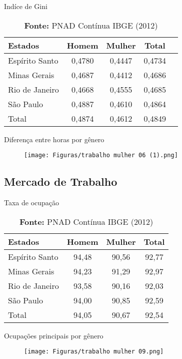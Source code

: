 \documentclass[xcolor={dvipsnames}]{beamer}
\begin{document}
\begin{frame}{Indíce de Gini}
    \begin{table}[h]
    \caption{Índice de Gini por UF e gênero}
    \centering
    \begin{tabular}{lcccc} \hline
    \textbf{Estados} & Homem  & Mulher & Total  \\\hline
    Espírito Santo   & 0,4780 & 0,4447 & 0,4734 \\
    Minas Gerais     & 0,4687 & 0,4412 & 0,4686 \\
    Rio de Janeiro   & 0,4668 & 0,4555 & 0,4685 \\
    São Paulo        & 0,4887 & 0,4610 & 0,4864 \\\hline
    Total            & 0,4874 & 0,4612 & 0,4849 \\\hline
    \end{tabular}
    \caption*{\textbf{Fonte:} PNAD Contínua IBGE (2012)}
\end{table}

\end{frame}

\begin{frame}{Diferença entre horas por gênero}
    \begin{figure}
        \centering
        \texttt{[image: Figuras/trabalho mulher 06 (1).png]}
        \label{fig:my_label}
    \end{figure}
\end{frame}

\subsection{Mercado de Trabalho}
\begin{frame}{Taxa de ocupação}
    \begin{table}[H]
    \caption{Taxa de ocupação por estado (\%)}
    \centering
    \begin{tabular}{lccc}
    \textbf{Estados} & Homem & Mulher& Total \\\hline
    Espírito Santo   & 94,48 & 90,56 & 92,77 \\
    Minas Gerais     & 94,23 & 91,29 & 92,97 \\
    Rio de Janeiro   & 93,58 & 90,16 & 92,03 \\
    São Paulo        & 94,00 & 90,85 & 92,59 \\\hline
    Total            & 94,05 & 90,67 & 92,54 \\\hline         
    \end{tabular}
    \caption*{\textbf{Fonte:} PNAD Contínua IBGE (2012)}
\end{table}

\end{frame}
\begin{frame}{Ocupações principais por gênero}
    \begin{figure}
        \centering
        \texttt{[image: Figuras/trabalho mulher 09.png]}
    \end{figure}
\end{frame}
\end{document}
